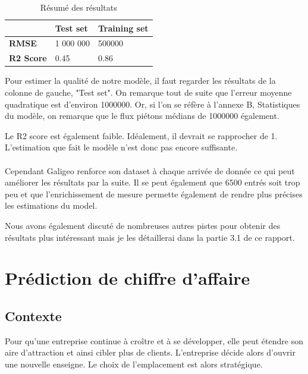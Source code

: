 \begin{table}[H]
    \centering
    \begin{tabular}{l|l|l|}
    \cline{2-3}
                                            & \textbf{Test set} & \textbf{Training set} \\ \hline
    \multicolumn{1}{|l|}{\textbf{RMSE}}     & 1 000 000         & 500000                \\ \hline
    \multicolumn{1}{|l|}{\textbf{R2 Score}} & 0.45              & 0.86                  \\ \hline
    \end{tabular}
    \caption{Résumé des résultats}
\end{table}

Pour estimer la qualité de notre modèle, il faut regarder les résultats de la colonne de gauche, "Test set". On remarque tout de suite que l’erreur moyenne quadratique est d’environ 1000000. Or, si l’on se réfère à l’annexe B, Statistiques du modèle, on remarque que le flux piétons médians de 1000000 également.

Le R2 score est également faible. Idéalement, il devrait se rapprocher de 1. L’estimation que fait le modèle n’est donc pas encore suffisante. 

\paragraph*{}

Cependant Galigeo renforce son dataset à chaque arrivée de donnée ce qui peut améliorer les résultats par la suite. Il se peut également que 6500 entrés soit trop peu et que l’enrichissement de mesure permette également de rendre plus précises les estimations du model.

Nous avons également discuté de nombreuses autres pistes pour obtenir des résultats plus intéressant mais je les détaillerai dans la partie 3.1 de ce rapport.

\section{Prédiction de chiffre d'affaire}

\subsection{Contexte}

Pour qu’une entreprise continue à croître et à se développer, elle peut étendre son aire d’attraction et ainsi cibler plus de clients. L’entreprise décide alors d’ouvrir une nouvelle enseigne. Le choix de l’emplacement est alors stratégique.


